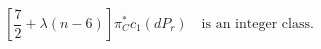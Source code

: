 \begin{equation}
\label{BCetaChernYuk}
\left[ \frac{7}{2} + \lambda ( n - 6 ) \right] \pi^{*}_{C} c_{1}(dP_{r})
\quad 
\textrm{is an integer class}.  
\end{equation}

